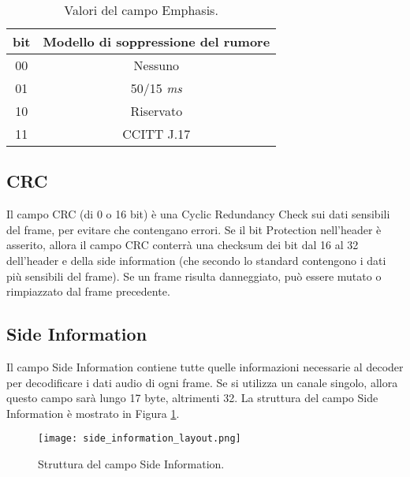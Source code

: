 \begin{itemize}
				\begin{table}[h!]
					\centering
					\begin{tabular}{|c|c|}
						\multicolumn{1}{c}{\textbf{bit}} & \multicolumn{1}{c}{\textbf{Modello di soppressione del rumore}}\\
						\hline
						00 & Nessuno\\
						\hline
						01 & 50/15 \textit{ms}\\
						\hline
						10 & Riservato\\
						\hline
						11 & CCITT J.17\\
						\hline
					\end{tabular}
					\caption{Valori del campo Emphasis.}
					\label{tab:campo_emphasis}
				\end{table}
			
		\end{itemize}
		
		\subsection{CRC} \label{subsec:crc}
			
			Il campo CRC (di 0 o 16 bit) è una Cyclic Redundancy Check sui dati sensibili del frame, per evitare che contengano errori. Se il bit Protection nell'header è asserito, allora il campo CRC conterrà una checksum dei bit dal 16 al 32 dell'header e della side information (che secondo lo standard contengono i dati più sensibili del frame). Se un frame risulta danneggiato, può essere mutato o rimpiazzato dal frame precedente.
		
		\subsection{Side Information} \label{subsec:side_information}
			
			Il campo Side Information contiene tutte quelle informazioni necessarie al decoder per decodificare i dati audio di ogni frame. Se si utilizza un canale singolo, allora questo campo sarà lungo 17 byte, altrimenti 32. La struttura del campo Side Information è mostrato in Figura \ref{fig:side_information_layout}.\\
			
			\begin{figure}[h!]
				\centering
					\texttt{[image: side\_information\_layout.png]}
				\caption{Struttura del campo Side Information.}
				\label{fig:side_information_layout}
			\end{figure}
		
